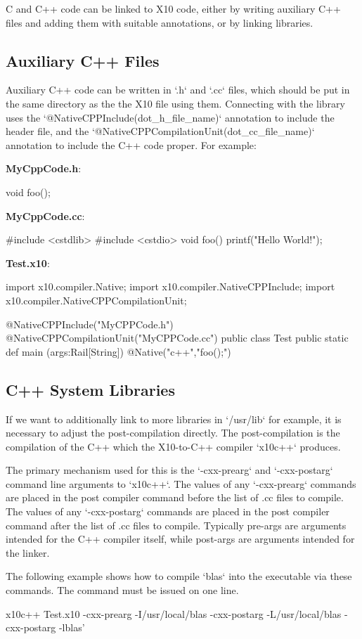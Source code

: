 C and C++ code can be linked to X10 code, either by writing auxiliary C++ files and
adding them with suitable annotations, or by linking libraries.

\subsection{Auxiliary C++ Files}

Auxiliary C++ code can be written in \xcd`.h` and \xcd`.cc` files, which
should be put in the same directory as the the X10 file using them.
Connecting with the library uses the \xcd`@NativeCPPInclude(dot_h_file_name)`
annotation to include the header file, and the 
\xcd`@NativeCPPCompilationUnit(dot_cc_file_name)` annotation to include the
C++ code proper.  For example: 

{\bf MyCppCode.h}: 
\begin{xten}
void foo();
\end{xten}


{\bf MyCppCode.cc}:
\begin{xten}
#include <cstdlib>
#include <cstdio>
void foo() {
    printf("Hello World!\n");
}
\end{xten}

{\bf Test.x10}:
\begin{xten}
import x10.compiler.Native;
import x10.compiler.NativeCPPInclude;
import x10.compiler.NativeCPPCompilationUnit;

@NativeCPPInclude("MyCPPCode.h")
@NativeCPPCompilationUnit("MyCPPCode.cc")
public class Test {
    public static def main (args:Rail[String]) {
        { @Native("c++","foo();") {} }
    }
}
\end{xten}

\subsection{C++ System Libraries}

If we want to additionally link to more libraries in \xcd`/usr/lib` for
example, it is necessary to adjust the post-compilation directly.  The
post-compilation is the compilation of the C++ which the X10-to-C++ compiler
\xcd`x10c++` produces.  

The primary mechanism used for this is the \xcd`-cxx-prearg` and
\xcd`-cxx-postarg` command line arguments to
\xcd`x10c++`. The values of any \xcd`-cxx-prearg` commands are placed
in the post compiler command before the list of .cc files to compile.
The values of any \xcd`-cxx-postarg` commands are placed in the post
compiler command after the list of .cc files to compile. Typically
pre-args are arguments intended for the C++ compiler itself, while
post-args are arguments intended for the linker. 

The following example shows how to compile \xcd`blas` into the
executable via these commands. The command must be issued on one line.

\begin{xten}
x10c++ Test.x10 -cxx-prearg -I/usr/local/blas 
  -cxx-postarg -L/usr/local/blas -cxx-postarg -lblas'
\end{xten}

